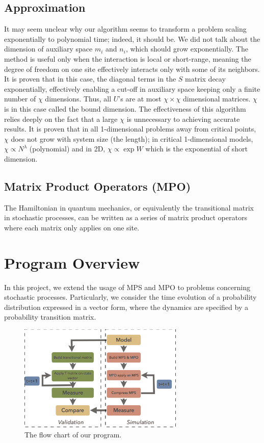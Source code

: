 \documentclass[english]{article}
\begin{document}
\subsection{Approximation}

It may seem unclear why our algorithm seems to transform a
 problem scaling exponentially to polynomial time; indeed, it should be.
We did not talk about the dimension of auxiliary space $m_{i}$ and
$n_{i}$, which should grow exponentially. The method is useful
only when the interaction is local or short-range, meaning the
degree of freedom on one site  effectively interacts only with some
of its neighbors. It is proven that in this case, the diagonal terms
in the $S$ matrix decay exponentially, effectively enabling a cut-off
in auxiliary space keeping only a finite number of $\chi$ dimensions. Thus, all $U$'s are at most $\chi\times\chi$ dimensional matrices.
$\chi$ is in this case called the bound dimension. The effectiveness of this algorithm
relies deeply on the fact that a large $\chi$ is unnecessary to achieving accurate
results. It is proven that in all 1-dimensional problems away from critical
points, $\chi$ does not grow with system size (the length); in critical
1-dimensional models, $\chi\propto N^{\lambda}$ (polynomial) and
in 2D, $\chi\propto\exp W$ which is the exponential of short dimension.


\subsection{Matrix Product Operators (MPO)}
The Hamiltonian in quantum mechanics, or equivalently the transitional matrix in stochastic processes, can be written as a series of matrix product operators where each matrix only applies on one site.


\section{Program Overview}
In this project, we extend the usage of MPS and MPO to problems concerning stochastic processes. Particularly, we  consider the time evolution of a probability distribution expressed in a vector form, where the dynamics are specified by a probability transition matrix.

\begin{figure}[htbp]
\begin{center}
\includegraphics[width=0.7\textwidth]{flow_chart_new.pdf}
\caption{The flow chart of our program.}
\label{fig:flow_chart}
\end{center}
\end{figure}
\end{document}
